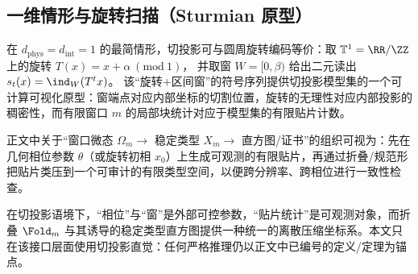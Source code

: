 \subsection{一维情形与旋转扫描（Sturmian 原型）}

在 \(d_{\mathrm{phys}}=d_{\mathrm{int}}=1\) 的最简情形，切投影可与圆周旋转编码等价：取 \(\mathbb{T}^1=\RR/\ZZ\) 上的旋转
\(
T(x)=x+\alpha\ (\mathrm{mod}\ 1)
\)，
并取窗 \(W=[0,\beta)\) 给出二元读出
\(
s_t(x)=\ind_W(T^t x)
\)。
该“旋转+\(\)区间窗”的符号序列提供切投影模型集的一个可计算可视化原型：窗端点对应内部坐标的切割位置，旋转的无理性对应内部投影的稠密性，而有限窗口 \(m\) 的局部块统计对应于模型集的有限贴片计数。

正文中关于“窗口微态 \(\Omega_m\)\(\to\) 稳定类型 \(X_m\)\(\to\) 直方图/证书”的组织可视为：先在几何相位参数 \(\theta\)（或旋转初相 \(x_0\)）上生成可观测的有限贴片，再通过折叠/规范形把贴片类压到一个可审计的有限类型空间，以便跨分辨率、跨相位进行一致性检查。

\begin{remark}
在切投影语境下，“相位”与“窗”是外部可控参数，“贴片统计”是可观测对象，而折叠 \(\Fold_m\) 与其诱导的稳定类型直方图提供一种统一的离散压缩坐标系。本文只在该接口层面使用切投影直觉：任何严格推理仍以正文中已编号的定义/定理为锚点。
\end{remark}


